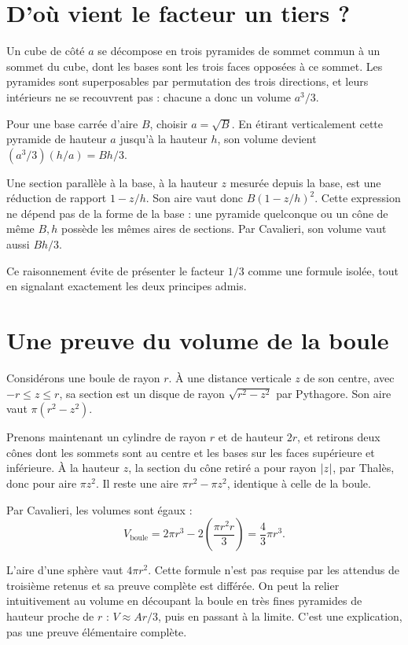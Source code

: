 \documentclass[../cours_3e.tex]{subfiles}
\begin{document}
\section{D'où vient le facteur un tiers ?}
\begin{demonstration}
Un cube de côté $a$ se décompose en trois pyramides de sommet commun à un sommet du cube, dont les bases sont les trois faces opposées à ce sommet. Les pyramides sont superposables par permutation des trois directions, et leurs intérieurs ne se recouvrent pas : chacune a donc un volume $a^3/3$.

Pour une base carrée d'aire $B$, choisir $a=\sqrt B$. En étirant verticalement cette pyramide de hauteur $a$ jusqu'à la hauteur $h$, son volume devient $(a^3/3)(h/a)=Bh/3$.

Une section parallèle à la base, à la hauteur $z$ mesurée depuis la base, est une réduction de rapport $1-z/h$. Son aire vaut donc $B(1-z/h)^2$. Cette expression ne dépend pas de la forme de la base : une pyramide quelconque ou un cône de même $B,h$ possède les mêmes aires de sections. Par Cavalieri, son volume vaut aussi $Bh/3$.
\end{demonstration}
Ce raisonnement évite de présenter le facteur $1/3$ comme une formule isolée, tout en signalant exactement les deux principes admis.
\section{Une preuve du volume de la boule}
\begin{demonstration}
Considérons une boule de rayon $r$. À une distance verticale $z$ de son centre, avec $-r\leq z\leq r$, sa section est un disque de rayon $\sqrt{r^2-z^2}$ par Pythagore. Son aire vaut $\pi(r^2-z^2)$.

Prenons maintenant un cylindre de rayon $r$ et de hauteur $2r$, et retirons deux cônes dont les sommets sont au centre et les bases sur les faces supérieure et inférieure. À la hauteur $z$, la section du cône retiré a pour rayon $\left|z\right|$, par Thalès, donc pour aire $\pi z^2$. Il reste une aire $\pi r^2-\pi z^2$, identique à celle de la boule.

Par Cavalieri, les volumes sont égaux :
\[V_{\text{boule}}=2\pi r^3-2\left(\frac{\pi r^2r}{3}\right)
=\frac43\pi r^3.\]
\end{demonstration}
\approfondissement L'aire d'une sphère vaut $4\pi r^2$. Cette formule n'est pas requise par les attendus de troisième retenus et sa preuve complète est différée. On peut la relier intuitivement au volume en découpant la boule en très fines pyramides de hauteur proche de $r$ : $V\approx Ar/3$, puis en passant à la limite. C'est une explication, pas une preuve élémentaire complète.
\end{document}
